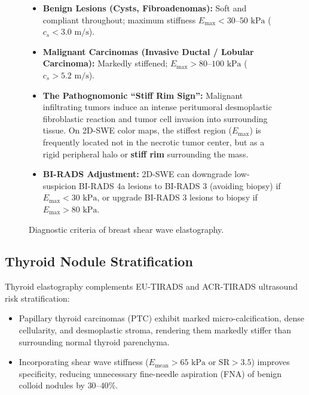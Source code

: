 \documentclass[11pt,a4paper]{article}
\begin{document}
\begin{figure}[htbp]
\centering
\begin{tcolorbox}[colback=teal!5!white,colframe=teal!60!black,title=\textbf{Diagnostic Criteria for Breast Shear Wave Elastography},width=\linewidth]
\small
\begin{itemize}[leftmargin=1.5em]
    \item \textbf{Benign Lesions (Cysts, Fibroadenomas):} Soft and compliant throughout; maximum stiffness $E_{\text{max}} < 30\text{--}50\text{ kPa}$ ($c_s < 3.0\text{ m/s}$).
    \item \textbf{Malignant Carcinomas (Invasive Ductal / Lobular Carcinoma):} Markedly stiffened; $E_{\text{max}} > 80\text{--}100\text{ kPa}$ ($c_s > 5.2\text{ m/s}$).
    \item \textbf{The Pathognomonic ``Stiff Rim Sign'':} Malignant infiltrating tumors induce an intense peritumoral desmoplastic fibroblastic reaction and tumor cell invasion into surrounding tissue. On 2D-SWE color maps, the stiffest region ($E_{\text{max}}$) is frequently located not in the necrotic tumor center, but as a rigid peripheral halo or \textbf{stiff rim} surrounding the mass.
    \item \textbf{BI-RADS Adjustment:} 2D-SWE can downgrade low-suspicion BI-RADS 4a lesions to BI-RADS 3 (avoiding biopsy) if $E_{\text{max}} < 30\text{ kPa}$, or upgrade BI-RADS 3 lesions to biopsy if $E_{\text{max}} > 80\text{ kPa}$.
\end{itemize}
\end{tcolorbox}
\caption{Diagnostic criteria of breast shear wave elastography.}
\label{fig:breast_swe}
\end{figure}

\subsection{Thyroid Nodule Stratification}
Thyroid elastography complements EU-TIRADS and ACR-TIRADS ultrasound risk stratification:
\begin{itemize}[leftmargin=2em]
    \item Papillary thyroid carcinomas (PTC) exhibit marked micro-calcification, dense cellularity, and desmoplastic stroma, rendering them markedly stiffer than surrounding normal thyroid parenchyma.
    \item Incorporating shear wave stiffness ($E_{\text{mean}} > 65\text{ kPa}$ or $\text{SR} > 3.5$) improves specificity, reducing unnecessary fine-needle aspiration (FNA) of benign colloid nodules by $30\text{--}40\%$.
\end{itemize}
\end{document}
